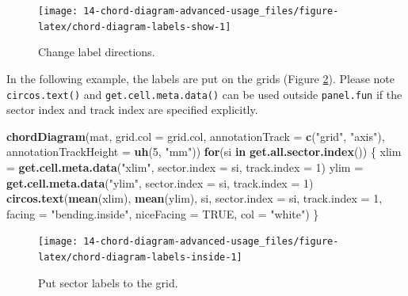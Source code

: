 \documentclass[]{book}
\newenvironment{Shaded}{\begin{snugshade}}{\end{snugshade}}
\newcommand{\KeywordTok}[1]{\textcolor[rgb]{0.13,0.29,0.53}{\textbf{#1}}}
\newcommand{\DataTypeTok}[1]{\textcolor[rgb]{0.13,0.29,0.53}{#1}}
\newcommand{\DecValTok}[1]{\textcolor[rgb]{0.00,0.00,0.81}{#1}}
\newcommand{\StringTok}[1]{\textcolor[rgb]{0.31,0.60,0.02}{#1}}
\newcommand{\OtherTok}[1]{\textcolor[rgb]{0.56,0.35,0.01}{#1}}
\newcommand{\ControlFlowTok}[1]{\textcolor[rgb]{0.13,0.29,0.53}{\textbf{#1}}}
\newcommand{\NormalTok}[1]{#1}
\begin{document}
\begin{figure}

{\centering \texttt{[image: 14-chord-diagram-advanced-usage\_files/figure-latex/chord-diagram-labels-show-1]} 

}

\caption{Change label directions.}\label{fig:chord-diagram-labels-show}
\end{figure}

In the following example, the labels are put on the grids (Figure
\ref{fig:chord-diagram-labels-inside}). Please note
\texttt{circos.text()} and \texttt{get.cell.meta.data()} can be used
outside \texttt{panel.fun} if the sector index and track index are
specified explicitly.

\begin{Shaded}
\begin{Highlighting}[]
\KeywordTok{chordDiagram}\NormalTok{(mat, }\DataTypeTok{grid.col =}\NormalTok{ grid.col, }
    \DataTypeTok{annotationTrack =} \KeywordTok{c}\NormalTok{(}\StringTok{"grid"}\NormalTok{, }\StringTok{"axis"}\NormalTok{), }\DataTypeTok{annotationTrackHeight =} \KeywordTok{uh}\NormalTok{(}\DecValTok{5}\NormalTok{, }\StringTok{"mm"}\NormalTok{))}
\ControlFlowTok{for}\NormalTok{(si }\ControlFlowTok{in} \KeywordTok{get.all.sector.index}\NormalTok{()) \{}
\NormalTok{    xlim =}\StringTok{ }\KeywordTok{get.cell.meta.data}\NormalTok{(}\StringTok{"xlim"}\NormalTok{, }\DataTypeTok{sector.index =}\NormalTok{ si, }\DataTypeTok{track.index =} \DecValTok{1}\NormalTok{)}
\NormalTok{    ylim =}\StringTok{ }\KeywordTok{get.cell.meta.data}\NormalTok{(}\StringTok{"ylim"}\NormalTok{, }\DataTypeTok{sector.index =}\NormalTok{ si, }\DataTypeTok{track.index =} \DecValTok{1}\NormalTok{)}
    \KeywordTok{circos.text}\NormalTok{(}\KeywordTok{mean}\NormalTok{(xlim), }\KeywordTok{mean}\NormalTok{(ylim), si, }\DataTypeTok{sector.index =}\NormalTok{ si, }\DataTypeTok{track.index =} \DecValTok{1}\NormalTok{, }
        \DataTypeTok{facing =} \StringTok{"bending.inside"}\NormalTok{, }\DataTypeTok{niceFacing =} \OtherTok{TRUE}\NormalTok{, }\DataTypeTok{col =} \StringTok{"white"}\NormalTok{)}
\NormalTok{\}}
\end{Highlighting}
\end{Shaded}

\begin{figure}

{\centering \texttt{[image: 14-chord-diagram-advanced-usage\_files/figure-latex/chord-diagram-labels-inside-1]} 

}

\caption{Put sector labels to the grid.}\label{fig:chord-diagram-labels-inside}
\end{figure}
\end{document}

